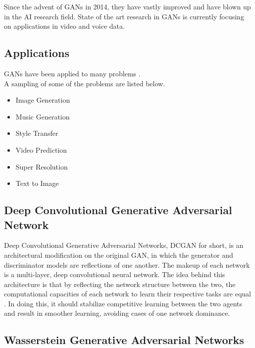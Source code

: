 \documentclass[12pt,
 reprint,
nofootinbib,
 amsmath,amssymb,
 aps,
floatfix,
]{revtex4-2}
\begin{document}


Since the advent of GANs in 2014, they have vastly improved and have blown up in the AI research field.
State of the art research in GANs is currently focusing on applications in video and voice data. 

\subsection{\label{sec:applications}Applications}

GANs have been applied to many problems \cite{overviewDocument}.\\
A sampling of some of the problems are listed below. 

\begin{itemize}
    \item Image Generation
    \item Music Generation
    \item Style Transfer
    \item Video Prediction
    \item Super Resolution
    \item Text to Image 
\end{itemize}


\subsection{\label{sec:level2}Deep Convolutional Generative Adversarial Network}

Deep Convolutional Generative Adversarial Networks, DCGAN for short, is an architectural modification on the original GAN, in which the generator and discriminator models are reflections of one another.
The makeup of each network is a multi-layer, deep convolutional neural network. The idea behind this architecture is that by reflecting the network structure between the two, the computational capacities of each network to learn their respective tasks are equal \cite{radford2015unsupervised}.
In doing this, it should stabilize competitive learning between the two agents and result in smoother learning, avoiding cases of one network dominance.


\subsection{\label{sec:wgan}Wasserstein Generative Adversarial Networks}
\end{document}
